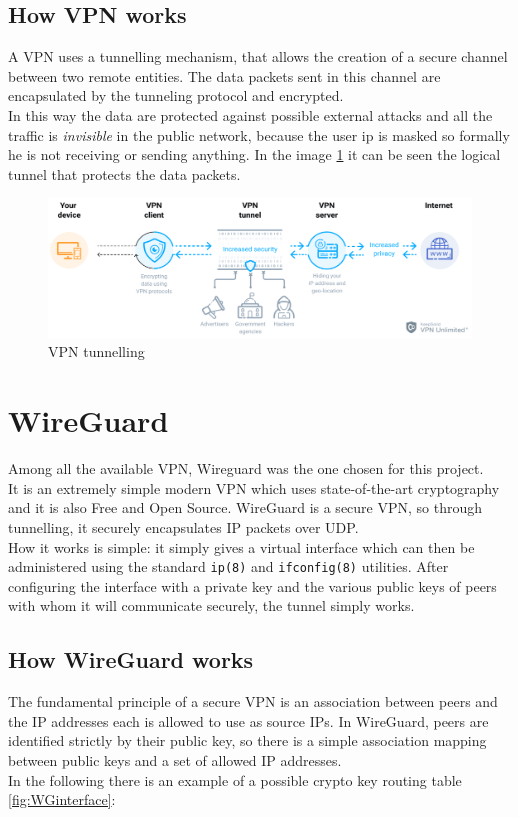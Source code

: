 \subsection{How VPN works}
A VPN uses a tunnelling mechanism, that allows the creation of a secure channel between two remote entities.
The data packets sent in this channel are encapsulated by the tunneling protocol and encrypted.\\
In this way the data are protected against possible external attacks and all the traffic is \emph{invisible} in the public network, because the user ip is masked so formally he is not receiving or sending anything.
In the image \ref{fig:vpnTunnel} it can be seen the logical tunnel that protects the data packets.
\begin{figure}[H]
    \vspace{0.5cm}
    \includegraphics[width=\textwidth, scale=0.25]{images/vpnTunnel.png}
    \caption{VPN tunnelling}
    \label{fig:vpnTunnel} %

\end{figure}


\section{WireGuard}
Among all the available VPN, Wireguard \cite{WireGuard} was the one chosen for this project.\\
It is an extremely simple modern VPN which uses state-of-the-art cryptography and it is also Free and Open Source. 
WireGuard is a secure VPN, so through tunnelling, it securely encapsulates IP packets over UDP.\\
How it works is simple: it simply gives a virtual interface which can then be administered using the standard \texttt{ip(8)} and \texttt{ifconfig(8)} utilities. After configuring the interface with a private key and the various public keys of peers with whom it will communicate
securely, the tunnel simply works.

\subsection{How WireGuard works}
The fundamental principle of a secure VPN is an association between peers and the IP addresses each is allowed
to use as source IPs. In WireGuard, peers are identified strictly by their public key, so there is a simple association mapping between public keys and a set of allowed IP addresses.\\
In the following there is an example of a possible crypto key routing table \ref{fig:WGinterface}:

